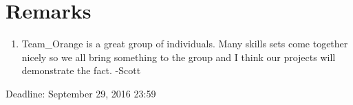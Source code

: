 \documentclass [10pt] {article}
\begin{document}
\section{Remarks}
\begin{enumerate}
\item Team\_Orange is a great group of individuals.  Many skills sets come together nicely so we all bring something to the group and I think our projects will demonstrate the fact. -Scott
\end{enumerate}

Deadline: September 29, 2016 23:59
\end{document}
